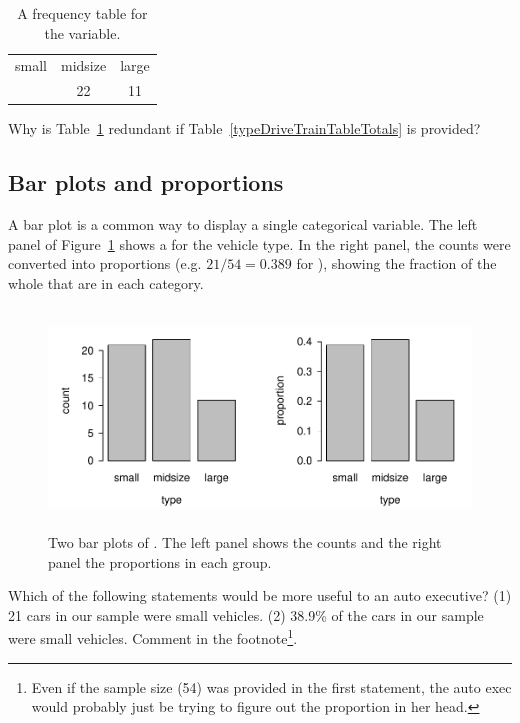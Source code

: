\begin{table}[htb]
\centering
\begin{tabular}{ccc}
  \hline
small & midsize & large \\ 
  \grayline
21 &  22 &  11 \\ 
   \hline
\end{tabular}
\caption{A frequency table for the  variable.}
\label{typeContTable}
\end{table} %

\begin{exercise}
Why is Table~\ref{typeContTable} redundant if Table~\ref{typeDriveTrainTableTotals} is provided?
\end{exercise}

\subsection{Bar plots and proportions}

A bar plot is a common way to display a single categorical variable. The left panel of Figure~\ref{typeBarPlot} shows a  for the vehicle type. In the right panel, the counts were converted into proportions (e.g. $21/54=0.389$ for ), 
showing the fraction of the whole that are in each category.
\begin{figure}[bht]
   \centering
   \includegraphics[height=2.3in]{01/figures/typeBarPlot/typeBarPlot}
   \caption{Two bar plots of . The left panel shows the counts and the right panel the proportions in each group.}
   \label{typeBarPlot}
\end{figure}

\begin{exercise}
Which of the following statements would be more useful to an auto executive? (1) 21 cars in our sample were small vehicles. (2) 38.9\% of the cars in our sample were small vehicles. Comment in the footnote\footnote{Even if the sample size (54) was provided in the first statement, the auto exec would probably just be trying to figure out the proportion in her head.}.
\end{exercise}

